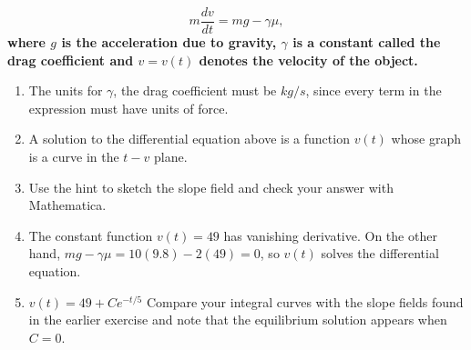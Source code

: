 \documentclass[11pt,a4paper,twoside]{article}
\begin{document}
	$$
	m\frac{dv}{dt} = mg - \gamma \mu,
	$$
	\textbf{where $g$ is the acceleration due to gravity, $\gamma$ is a constant called the drag coefficient and $v = v(t)$ denotes the velocity of the object.}
	\begin{enumerate}[\bfseries 1)]
		\item The units for $\gamma$, the drag coefficient must be $kg/s$, since every term in the expression must have units of force.
		\item A solution to the differential equation above is a function $v(t)$ whose graph is a curve in the $t-v$ plane.
		\item Use the hint to sketch the slope field and check your answer with Mathematica.
		\item The constant function $v(t) = 49$ has vanishing derivative. On the other hand, $mg − \gamma \mu = 10(9.8) − 2(49) = 0$, so $v(t)$ solves the differential equation.
		\item $v(t) = 49 + Ce^{-t/5}$ Compare your integral curves with the slope fields found in the earlier exercise and note that the equilibrium solution appears when $C = 0$.
	\end{enumerate}
\end{document}
